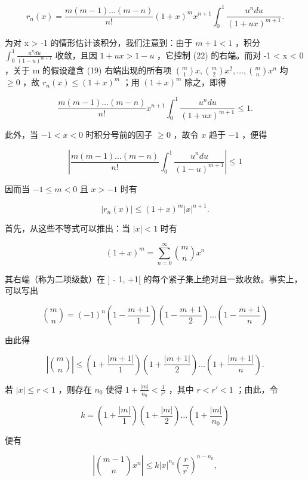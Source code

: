 \[
r _ {n} (x) = \frac {m (m - 1) \dots (m - n)}{n !} (1 + x) ^ {m} x ^ {n + 1} \int_ {0} ^ {1} \frac {u ^ {n} d u}{(1 + u x) ^ {m + 1}}.\tag{22}
\]

为对 x \textgreater{} -1 的情形估计该积分，我们注意到：由于 \(m + 1 < 1\) ，积分 \(\int_{0}^{1}\frac{u^{n}du}{(1-u)^{m+1}}\) 收敛，且因 \(1+ux > 1-u\) ，它控制 (22) 的右端。而对 -1 \textless{} x \textless{} 0 ，关于 m 的假设蕴含 (19) 右端出现的所有项 \(\binom{m}{1}x,\binom{m}{2}x^{2},\ldots,\binom{m}{n}x^{n}\) 均 \(\geqslant 0\) ，故 \(r_{n}(x) \leqslant (1+x)^{m}\) ；用 \((1+x)^{m}\) 除之，即得

\[
\frac {m (m - 1) \dots (m - n)}{n !} x ^ {n + 1} \int_ {0} ^ {1} \frac {u ^ {n} d u}{(1 + u x) ^ {m + 1}} \leqslant 1.
\]

此外，当 \(-1 < x < 0\) 时积分号前的因子 \(\geqslant 0\) ，故令 \(x\) 趋于 \(-1\) ，便得

\[
\left| \frac {m (m - 1) \dots (m - n)}{n !} \int_ {0} ^ {1} \frac {u ^ {n} d u}{(1 - u) ^ {m + 1}} \right| \leqslant 1
\]

因而当 \(-1 \leqslant m < 0\) 且 \(x > -1\) 时有

\[
\left| r _ {n} (x) \right| \leqslant (1 + x) ^ {m} | x | ^ {n + 1}.\tag{23}
\]

首先，从这些不等式可以推出：当 \(|x| < 1\) 时有

\[
(1 + x) ^ {m} = \sum_ {n = 0} ^ {\infty} \binom {m} {n} x ^ {n}\tag{24}
\]

其右端（称为二项级数）在 {]} - 1, +1{[} 的每个紧子集上绝对且一致收敛。事实上，可以写出

\[
\binom {m} {n} = (- 1) ^ {n} \left(1 - \frac {m + 1}{1}\right) \left(1 - \frac {m + 1}{2}\right) \dots \left(1 - \frac {m + 1}{n}\right)\tag{25}
\]

由此得

\[
\left| \binom {m} {n} \right| \leqslant \left(1 + \frac {| m + 1 |}{1}\right) \left(1 + \frac {| m + 1 |}{2}\right) \dots \left(1 + \frac {| m + 1 |}{n}\right).
\]

若 \(|x| \leqslant r < 1\) ，则存在 \(n_0\) 使得 \(1 + \frac{|m|}{n_0} < \frac{1}{r'}\) ，其中 \(r < r' < 1\) ；由此，令

\[
k = \left(1 + \frac {| m |}{1}\right) \left(1 + \frac {| m |}{2}\right) \dots \left(1 + \frac {| m |}{n _ {0}}\right)
\]

便有

\[
\left| \binom {m - 1} {n} x ^ {n} \right| \leqslant k | x | ^ {n _ {0}} \left(\frac {r}{r ^ {\prime}}\right) ^ {n - n _ {0}},
\]

